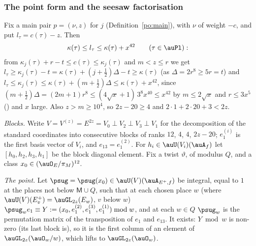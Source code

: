 \documentclass[10pt]{amsart}
\theoremstyle{definition}
\theoremstyle{remark}
\begin{document}
\subsubsection{The point form and the seesaw factorisation}\label{psu:ss-seesaw}

Fix a main pair $p=(\nu,z)$ for $j$ (Definition~\ref{po:main}), with $\nu$ of weight $-c$, and put
$l_\tau=c(\tau)-z$. Then
\begin{equation}\label{psu:eq-range}
\kappa(\tau)\le l_\tau\le\kappa(\tau)+x^{42}\qquad(\tau\in\auPl):
\end{equation}
from $\kappa_j(\tau)+r-t\le c(\tau)\le\kappa_j(\tau)$ and $m<z\le r$ we get $l_\tau\ge\kappa_j(\tau)-t
=\kappa(\tau)+(j+\frac12)\Delta-t\ge\kappa(\tau)$ (as $\Delta=2r^8\ge5r=t$) and $l_\tau\le\kappa_j(\tau)
\le\kappa(\tau)+(m+\frac12)\Delta\le\kappa(\tau)+x^{42}$, since $(m+\frac12)\Delta=(2m+1)r^8\le(4\sqrt x+1)\,3^8x^{40}\le x^{42}$ by $m\le2\sqrt x$ and $r\le3x^5$ ({\cite[Definition~13.3(D3)]{P46}}) and $x$ large. Also
$z>m\ge10^4$, so $2z-20\ge4$ and $2\cdot1+2\cdot20+3<2z$.

\emph{Blocks.} Write $V=V^{(z)}=E^{2z}=V_0\perp V_2\perp V_3\perp V_1$ for the decomposition of the
standard coordinates into consecutive blocks of ranks $12$, $4$, $4$, $2z-20$; $e^{(i)}_1$ is the
first basis vector of $V_i$, and $e_{13}=e^{(2)}_1$. For $h_i\in\auU(V_i)(\auA_f)$ let
$[h_0,h_2,h_3,h_1]$ be the block diagonal element. Fix a twist $\vartheta$, of modulus $Q$, and a
class $x_0\in(\auO_E/\pi_M)^{12}$.

\emph{The point.} Let $\psug=\psug(x_0)\in\auU(V)(\auA_{E^+,f})$ be integral, equal to $1$ at the places
not below $\mathsf M\cup Q$, such that at each chosen place $w$ (where $\auU(V)(E^+_v)=\auGL_{2z}(E_w)$,
$v$ below $w$) $\psug_we_1\equiv Y:=(x_0,e^{(2)}_1,e^{(3)}_1,e^{(1)}_1)\bmod w$, and at each $w\in Q$
$\psug_w$ is the permutation matrix of the transposition of $e_1$ and $e_{13}$. It exists: $Y\bmod w$
is non-zero (its last block is), so it is the first column of an element of $\auGL_{2z}(\auO_w/w)$,
which lifts to $\auGL_{2z}(\auO_w)$.
\end{document}
